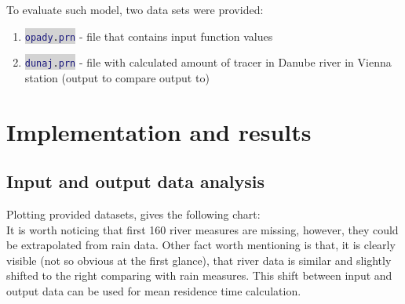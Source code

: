 \documentclass[onecolumn]{article}
\newcommand{\inlinecode}[2]{\colorbox{lightgray}{\lstinline[language=#1]$#2$}}
\begin{document}
To evaluate such model, two data sets were provided:
\begin{enumerate}
	\item \inlinecode{matlab}{opady.prn} - file that contains input function values
    \item \inlinecode{matlab}{dunaj.prn} - file with calculated amount of tracer in Danube river in Vienna station (output to compare output to)
\end{enumerate}

\newpage
\section{Implementation and results}

\subsection{Input and output data analysis}
Plotting provided datasets, gives the following chart:\\
\noindent{}
It is worth noticing that first 160 river measures are missing, however, they could be extrapolated from rain data. Other fact worth mentioning is that, it is clearly visible (not so obvious at the first glance), that river data is similar and slightly shifted to the right comparing with rain measures. This shift between input and output data can be used for mean residence time calculation.  
\end{document}
